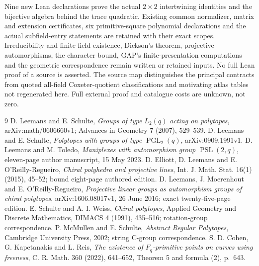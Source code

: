 \documentclass[11pt,a4paper]{article}
\newcommand{\PSL}{\operatorname{PSL}}
\newcommand{\PGL}{\operatorname{PGL}}
\begin{document}
Nine new Lean declarations prove the actual $2\times2$ intertwining
identities and the bijective algebra behind the trace quadratic. Existing
common normalizer, matrix and extension certificates, six primitive-square
polynomial declarations and the actual subfield-entry statements are
retained with their exact scopes. Irreducibility and finite-field existence,
Dickson's theorem, projective automorphisms, the character bound, GAP's
finite-presentation computations and the geometric correspondence remain
written or retained inputs. No full Lean proof of a source is asserted.
The source map distinguishes the principal contracts from quoted all-field
Coxeter-quotient classifications and motivating atlas tables not regenerated
here. Full external proof and catalogue costs are unknown, not zero.
\begin{thebibliography}{9}
 D. Leemans and E. Schulte, \emph{Groups of type $L_2(q)$ acting
on polytopes}, arXiv:math/0606660v1; Advances in Geometry 7 (2007), 529--539.
 D. Leemans and E. Schulte, \emph{Polytopes with groups of type
$\PGL_2(q)$}, arXiv:0909.1991v1.
 D. Leemans and M. Toledo, \emph{Maniplexes with automorphism
group $\PSL(2,q)$}, eleven-page author manuscript, 15 May 2023.
 D. Elliott, D. Leemans and E. O'Reilly-Regueiro,
\emph{Chiral polyhedra and projective lines}, Int. J. Math. Stat.
16(1) (2015), 45--52; bound eight-page authored edition.
 D. Leemans, J. Moerenhout and E. O'Reilly-Regueiro,
\emph{Projective linear groups as automorphism groups of chiral polytopes},
arXiv:1606.08017v1, 26 June 2016; exact twenty-five-page edition.
 E. Schulte and A. I. Weiss, \emph{Chiral polytopes},
Applied Geometry and Discrete Mathematics, DIMACS 4 (1991), 435--516;
rotation-group correspondence.
 P. McMullen and E. Schulte, \emph{Abstract Regular Polytopes},
Cambridge University Press, 2002; string C-group correspondence.
 S. D. Cohen, G. Kapetanakis and L. Reis,
\emph{The existence of $F_q$-primitive points on curves using freeness},
C. R. Math. 360 (2022), 641--652, Theorem 5 and formula (2), p.~643.
\end{thebibliography}
\end{document}
